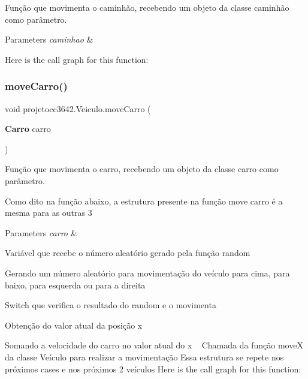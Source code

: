 Função que movimenta o caminhão, recebendo um objeto da classe caminhão como parâmetro. 


\begin{DoxyParams}{Parameters}
{\em caminhao} & \\
\hline
\end{DoxyParams}
Here is the call graph for this function\+:
\mbox{\label{classprojetocc3642_1_1_veiculo_acf6147f56489aac694024cfd001f2b63}} 
\subsubsection{move\+Carro()}
{\footnotesize\ttfamily void projetocc3642.\+Veiculo.\+move\+Carro (\begin{DoxyParamCaption}\item[{\textbf{ Carro}}]{carro }\end{DoxyParamCaption})}



Função que movimenta o carro, recebendo um objeto da classe carro como parâmetro. 

Como dito na função abaixo, a estrutura presente na função move carro é a mesma para as outras 3


\begin{DoxyParams}{Parameters}
{\em carro} & \\
\hline
\end{DoxyParams}
Variável que recebe o número aleatório gerado pela função random

Gerando um número aleatório para movimentação do veículo para cima, para baixo, para esquerda ou para a direita

Switch que verifica o resultado do random e o movimenta

Obtenção do valor atual da posição x

Somando a velocidade do carro no valor atual do x ~\newline
 Chamada da função moveX da classe Veículo para realizar a movimentação Essa estrutura se repete nos próximos cases e nos próximos 2 veículos Here is the call graph for this function\+:
\mbox{\label{classprojetocc3642_1_1_veiculo_a93ffe5019f130c6750dcde073687b9b8}} 
